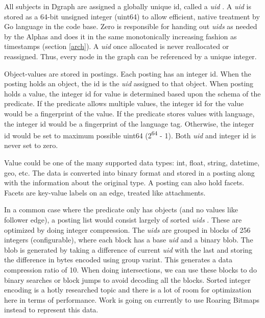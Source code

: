 \documentclass[letterpaper,twocolumn,10pt]{article}
\newcommand{\uid}{\textit{uid} }
\newcommand{\uids}{\textit{uids} }
\begin{document}
All subjects in Dgraph are assigned a globally unique id, called a \uid. A
\uid is stored as a 64-bit unsigned integer (uint64) to allow efficient, native
treatment by Go language in the code base. Zero is responsible for handing out
\uids as needed by the Alphas and does it in the same monotonically increasing
fashion as timestamps (section \ref{arch}). A \uid once allocated is never
reallocated or reassigned. Thus, every node in the graph can be referenced by a
unique integer.

Object-values are stored in postings. Each posting has an integer id. When the
posting holds an object, the id is the \uid assigned to that object. When posting
holds a value, the integer id for value is determined based upon the schema of
the predicate. If the predicate allows multiple values, the integer id for the
value would be a fingerprint of the value. If the predicate stores values with
language, the integer id would be a fingerprint of the language tag. Otherwise,
the integer id would be set to maximum possible uint64 (2\textsuperscript{64} -
1). Both \uid and integer id is never set to zero.

Value could be one of the many supported data types: int, float, string,
datetime, geo, etc. The data is converted into binary format and stored in a
posting along with the information about the original type. A posting can also
hold facets. Facets are key-value labels on an edge, treated like attachments.

In a common case where the predicate only has objects (and no values like
follower edge), a posting list would consist largely of sorted \uids. These are
optimized by doing integer compression. The \uids are grouped in blocks of 256
integers (configurable), where each block has a base \uid and a binary blob. The
blob is generated by taking a difference of current \uid with the last and
storing the difference in bytes encoded using group varint. This generates a
data compression ratio of 10. When doing intersections, we can use these blocks
to do binary searches or block jumps to avoid decoding all the blocks. Sorted
integer encoding is a hotly researched topic and there is a lot of room for
optimization here in terms of performance. Work is going on currently to use
Roaring Bitmaps\cite{roaring} instead to represent this data.
\end{document}
